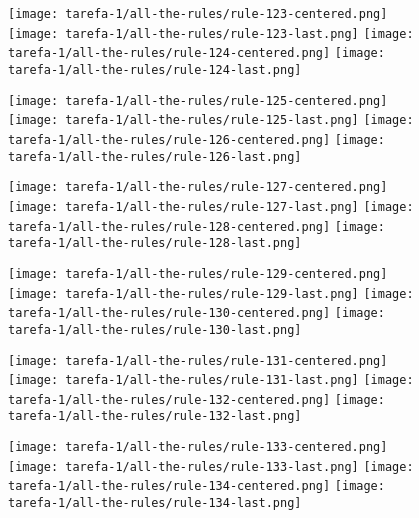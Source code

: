 \begin{figure}[htbp]
  \centering
\texttt{[image: tarefa-1/all-the-rules/rule-123-centered.png]}
\texttt{[image: tarefa-1/all-the-rules/rule-123-last.png]}
\texttt{[image: tarefa-1/all-the-rules/rule-124-centered.png]}
\texttt{[image: tarefa-1/all-the-rules/rule-124-last.png]}
\end{figure}
\begin{figure}[htbp]
  \centering
\texttt{[image: tarefa-1/all-the-rules/rule-125-centered.png]}
\texttt{[image: tarefa-1/all-the-rules/rule-125-last.png]}
\texttt{[image: tarefa-1/all-the-rules/rule-126-centered.png]}
\texttt{[image: tarefa-1/all-the-rules/rule-126-last.png]}
\end{figure}
\begin{figure}[htbp]
  \centering
\texttt{[image: tarefa-1/all-the-rules/rule-127-centered.png]}
\texttt{[image: tarefa-1/all-the-rules/rule-127-last.png]}
\texttt{[image: tarefa-1/all-the-rules/rule-128-centered.png]}
\texttt{[image: tarefa-1/all-the-rules/rule-128-last.png]}
\end{figure}
\begin{figure}[htbp]
  \centering
\texttt{[image: tarefa-1/all-the-rules/rule-129-centered.png]}
\texttt{[image: tarefa-1/all-the-rules/rule-129-last.png]}
\texttt{[image: tarefa-1/all-the-rules/rule-130-centered.png]}
\texttt{[image: tarefa-1/all-the-rules/rule-130-last.png]}
\end{figure}
\begin{figure}[htbp]
  \centering
\texttt{[image: tarefa-1/all-the-rules/rule-131-centered.png]}
\texttt{[image: tarefa-1/all-the-rules/rule-131-last.png]}
\texttt{[image: tarefa-1/all-the-rules/rule-132-centered.png]}
\texttt{[image: tarefa-1/all-the-rules/rule-132-last.png]}
\end{figure}
\begin{figure}[htbp]
  \centering
\texttt{[image: tarefa-1/all-the-rules/rule-133-centered.png]}
\texttt{[image: tarefa-1/all-the-rules/rule-133-last.png]}
\texttt{[image: tarefa-1/all-the-rules/rule-134-centered.png]}
\texttt{[image: tarefa-1/all-the-rules/rule-134-last.png]}
\end{figure}
